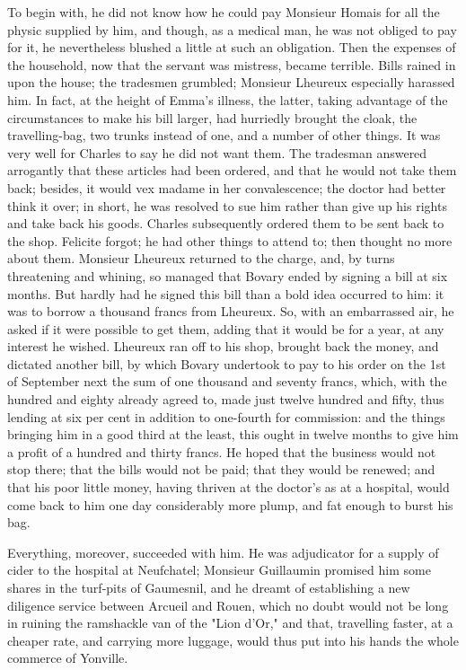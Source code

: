 \documentclass{tufte-book}
\begin{document}
To begin with, he did not know how he could pay Monsieur Homais for all
the physic supplied by him, and though, as a medical man, he was not
obliged to pay for it, he nevertheless blushed a little at such an
obligation. Then the expenses of the household, now that the servant was
mistress, became terrible. Bills rained in upon the house; the tradesmen
grumbled; Monsieur Lheureux especially harassed him. In fact, at
the height of Emma's illness, the latter, taking advantage of the
circumstances to make his bill larger, had hurriedly brought the cloak,
the travelling-bag, two trunks instead of one, and a number of other
things. It was very well for Charles to say he did not want them. The
tradesman answered arrogantly that these articles had been ordered, and
that he would not take them back; besides, it would vex madame in her
convalescence; the doctor had better think it over; in short, he was
resolved to sue him rather than give up his rights and take back his
goods. Charles subsequently ordered them to be sent back to the shop.
Felicite forgot; he had other things to attend to; then thought no more
about them. Monsieur Lheureux returned to the charge, and, by turns
threatening and whining, so managed that Bovary ended by signing a
bill at six months. But hardly had he signed this bill than a bold idea
occurred to him: it was to borrow a thousand francs from Lheureux.
So, with an embarrassed air, he asked if it were possible to get them,
adding that it would be for a year, at any interest he wished. Lheureux
ran off to his shop, brought back the money, and dictated another bill,
by which Bovary undertook to pay to his order on the 1st of September
next the sum of one thousand and seventy francs, which, with the hundred
and eighty already agreed to, made just twelve hundred and fifty, thus
lending at six per cent in addition to one-fourth for commission: and
the things bringing him in a good third at the least, this ought in
twelve months to give him a profit of a hundred and thirty francs. He
hoped that the business would not stop there; that the bills would not
be paid; that they would be renewed; and that his poor little money,
having thriven at the doctor's as at a hospital, would come back to him
one day considerably more plump, and fat enough to burst his bag.

Everything, moreover, succeeded with him. He was adjudicator for a
supply of cider to the hospital at Neufchatel; Monsieur Guillaumin
promised him some shares in the turf-pits of Gaumesnil, and he dreamt of
establishing a new diligence service between Arcueil and Rouen, which
no doubt would not be long in ruining the ramshackle van of the "Lion
d'Or," and that, travelling faster, at a cheaper rate, and carrying more
luggage, would thus put into his hands the whole commerce of Yonville.
\end{document}
